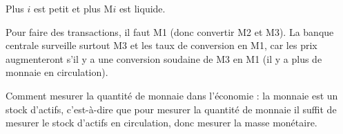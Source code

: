 	Plus $i$ est petit et plus M$i$ est liquide.
	
	Pour faire des transactions, il faut M1 (donc convertir M2 et M3). La banque centrale surveille surtout M3 et les taux de conversion en M1, car les prix augmenteront s'il y a une conversion soudaine de M3 en M1 (il y a plus de monnaie en circulation).
	
	Comment mesurer la quantité de monnaie dans l'économie : la monnaie est un stock d'actifs, c'est-à-dire que pour mesurer la quantité de monnaie il suffit de mesurer le stock d'actifs en circulation, donc mesurer la masse monétaire.
